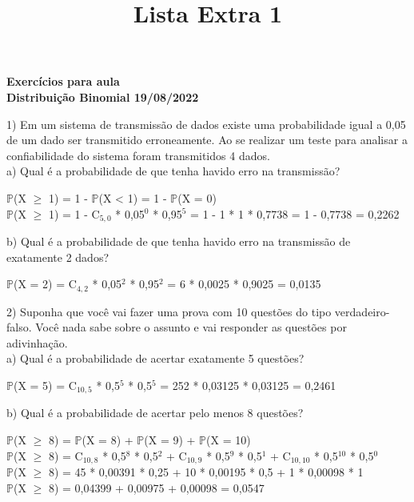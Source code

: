 \documentclass[12pt,a4paper]{article}
\title{Lista Extra 1}
\date{}
\begin{document}
	\maketitle
	\begin{center}
		\textbf{Exercícios para aula}\\
		\textbf{Distribuição Binomial 19/08/2022}
	\end{center}
	1) Em um sistema de transmissão de dados existe uma probabilidade igual a 0,05 de um dado ser transmitido erroneamente. Ao se realizar um teste para analisar a	confiabilidade do sistema foram transmitidos 4 dados.\\
	a) Qual é a probabilidade de que tenha havido erro na transmissão?
	\begin{center}
		\vspace{0.5cm}
		$\mathbb{P}$(X $\geq$ 1) = 1 - $\mathbb{P}$(X < 1) = 1 - $\mathbb{P}$(X = 0)
		\vspace{0.25cm}\\
		$\mathbb{P}$(X $\geq$ 1) = 1 - C$_{5, 0}$ * 0,05$^0$ * 0,95$^5$ = 1 - 1 * 1 * 0,7738 = 1 - 0,7738 = 0,2262  
	\end{center}
	\vspace{1cm}
	b) Qual é a probabilidade de que tenha havido erro na transmissão de
	exatamente 2 dados?
	\begin{center}
		$\mathbb{P}$(X = 2) = C$_{4, 2}$ * 0,05$^2$ * 0,95$^2$ = 6 * 0,0025 * 0,9025 = 0,0135
	\end{center}
	\vspace{1cm}
	2) Suponha que você vai fazer uma prova com 10 questões do tipo verdadeiro-falso. Você nada sabe sobre o assunto e vai responder as questões por adivinhação.\\
	a) Qual é a probabilidade de acertar exatamente 5 questões?
	\begin{center}
		\vspace{0.5cm}
		$\mathbb{P}$(X = 5) = C$_{10, 5}$ * 0,5$^5$ * 0,5$^5$ = 252 * 0,03125 * 0,03125 = 0,2461
	\end{center}
	\vspace{1cm}
	b) Qual é a probabilidade de acertar pelo menos 8 questões?
	\begin{center}
		\vspace{0.5cm}
		$\mathbb{P}$(X $\geq$ 8) = $\mathbb{P}$(X = 8) + $\mathbb{P}$(X = 9) + $\mathbb{P}$(X = 10)
		\vspace{0.25cm}\\
		$\mathbb{P}$(X $\geq$ 8) = C$_{10, 8}$ * 0,5$^8$ * 0,5$^2$ + C$_{10, 9}$ * 0,5$^9$ * 0,5$^1$ + C$_{10, 10}$ * 0,5$^{10}$ * 0,5$^0$
		\vspace{0.25cm}\\
		$\mathbb{P}$(X $\geq$ 8) = 45 * 0,00391 * 0,25 + 10 * 0,00195 * 0,5 + 1 * 0,00098 * 1
		\vspace{0.25cm}\\
		$\mathbb{P}$(X $\geq$ 8) = 0,04399 + 0,00975 + 0,00098 = 0,0547 
	\end{center}
\end{document}
